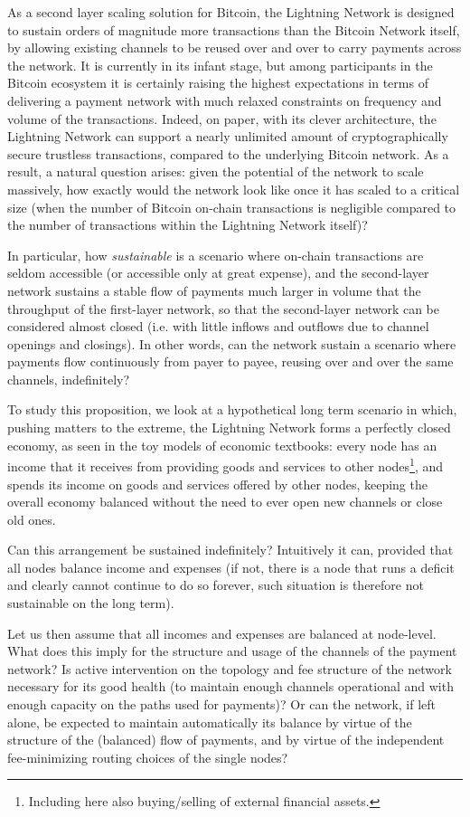\documentclass[a4paper]{article}
\begin{document}
As a second layer scaling solution for Bitcoin, the Lightning Network is designed to sustain orders of magnitude more transactions than the Bitcoin Network itself, by allowing existing channels to be reused over and over to carry payments across the network. It is currently in its infant stage, but among participants in the Bitcoin ecosystem it is certainly raising the highest expectations in terms of delivering a payment network with much relaxed constraints on frequency and volume of the transactions. Indeed, on paper, with its clever architecture, the Lightning Network can support a nearly unlimited amount of cryptographically secure trustless transactions, compared to the underlying Bitcoin network. As a result, a natural question arises: given the potential of the network to scale massively, how exactly would the network look like once it has scaled to a critical size (when the number of Bitcoin on-chain transactions is negligible compared to the number of transactions within the Lightning Network itself)?

In particular, how \emph{sustainable} is a scenario where on-chain transactions are seldom accessible (or accessible only at great expense), and the second-layer network sustains a stable flow of payments much larger in volume that the throughput of the first-layer network, so that the second-layer network can be considered almost closed (i.e. with little inflows and outflows due to channel openings and closings). In other words, can the network sustain a scenario where payments flow continuously from payer to payee, reusing over and over the same channels, indefinitely?

To study this proposition, we look at a hypothetical long term scenario in which, pushing matters to the extreme, the Lightning Network forms a perfectly closed economy, as seen in the toy models of economic textbooks: every node has an income that it receives from providing goods and services to other nodes\footnote{Including here also buying/selling of external financial assets.}, and spends its income on goods and services offered by other nodes, keeping the overall economy balanced without the need to ever open new channels or close old ones.

Can this arrangement be sustained indefinitely? Intuitively it can, provided that all nodes balance income and expenses (if not, there is a node that runs a deficit and clearly cannot continue to do so forever, such situation is therefore not sustainable on the long term).

Let us then assume that all incomes and expenses are balanced at node-level. What does this imply for the structure and usage of the channels of the payment network? Is active intervention on the topology and fee structure of the network necessary for its good health (to maintain enough channels operational and with enough capacity on the paths used for payments)? Or can the network, if left alone, be expected to maintain automatically its balance by virtue of the structure of the (balanced) flow of payments, and by virtue of the independent fee-minimizing routing choices of the single nodes?
\end{document}

